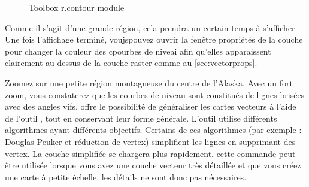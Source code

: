 \begin{figure}[ht]
\centering
    \hspace{0.5cm}
   \caption{\grass Toolbox r.contour module \nixcaption}\label{fig:grass_toolbox_rcontour}
\end{figure}

Comme il s'agit d'une grande région, cela prendra un certain temps à s'afficher. 
Une fois l'affichage terminé, voujspouvez ouvrir la fenêtre propriétés de la couche pour changer la couleur des cpourbes de niveai afin qu'elles apparaissent clairement au dessus de la couche raster comme au \ref{sec:vectorprops}.


Zoomez sur une petite région montagneuse du centre de l'Alaska. Avec un fort zoom, vous constaterez que les courbes de niveau sont constitués de lignes brisées avec des angles vifs. \grass offre le possibilité de généraliser les cartes vecteurs à l'aide de l'outil , tout en conservant leur forme générale. L'outil utilise différents algorithmes ayant différents objectifs. Certains de ces algorithmes (par exemple : Douglas Peuker et réduction de vertex) simplifient les lignes en supprimant des vertex. La couche simplifiée se chargera plus rapidement. cette commande peut être utilisée lorsque vous avez une couche vecteur très détaillée et que vous créez une carte à petite échelle. les détails ne sont donc pas nécessaires.

